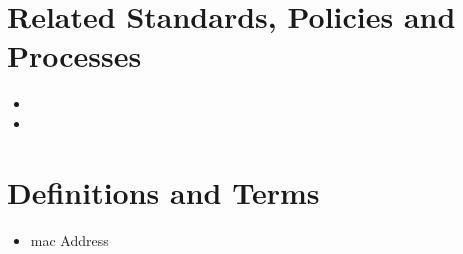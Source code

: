 \section{Related Standards, Policies\oxford{} and Processes}
\begin{itemize}
\item {}
\item {}
\end{itemize}

\section{Definitions and Terms}
\CommonDefinitionsAndTerms
\begin{itemize}
\item \gls{mac} Address
\end{itemize}
\CommonRevisionHistory
